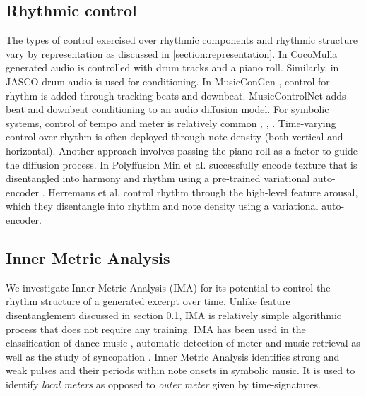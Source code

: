 \subsection{Rhythmic control} \label{section:rhytmic_weight}
The types of control exercised over rhythmic components and rhythmic structure vary by representation as discussed in \ref{section:representation}. In CocoMulla \cite{Lin_cocomulla_2024} generated audio is controlled with drum tracks and a piano roll. Similarly, in JASCO\cite{Tal_jasco} drum audio is used for conditioning. In MusicConGen \cite{Lan_Hsiao_Cheng_Yang_musicongen_2024}, control for rhythm is added through tracking beats and downbeat. MusicControlNet \cite{Wu_Donahue_musicontrolnet_2023} adds beat and downbeat conditioning to an audio diffusion model.
For symbolic systems, control of tempo and meter is relatively common \cite{Rütte_figaro_2023}, \cite{Huang_Yang_remi_pop_transformer_2020}, \cite{Lu_Xu_Kang_Yu_Xing_Tan_Bian_MuseCoco_2023}. Time-varying control over rhythm is often deployed through note density (both vertical and horizontal)\cite{Rütte_figaro_2023}\cite{Huang_rule_diffusion_2024}. Another approach \cite{Zhu_Liu_Jiang_Zheng_texture_2024} involves passing the piano roll as a factor to guide the diffusion process. In Polyffusion \cite{Min_Jiang_Xia_Zhao_polyffusion_2023} Min et al. successfully encode texture that is disentangled into harmony and rhythm using a pre-trained variational auto-encoder \cite{Wang_vae_chord_rhythm_2020}. Herremans et al. \cite{Tan_Herremans_2020} control rhythm through the high-level feature arousal, which they disentangle into rhythm and note density using a variational auto-encoder. 

\subsection{Inner Metric Analysis} \label{section:ima}
We investigate Inner Metric Analysis (IMA) for its potential to control the rhythm structure of a generated excerpt over time. Unlike feature disentanglement discussed in section \ref{section:rhytmic_weight}, IMA is relatively simple algorithmic process that does not require any training. IMA has been used in the classification of dance-music \cite{Chew_Volk_Lee_Dance_metric_weight_2005}, automatic detection of meter \cite{Haas_Volk_2016} and music retrieval \cite{Volk_Garbers_VanKranenburg_Wiering_Grijp_Veltkamp_2009} as well as the study of syncopation \cite{Bemman2024}\cite{Volk2008Syncopation}.
Inner Metric Analysis identifies strong and weak pulses and their periods within note onsets in symbolic music. It is used to identify \textit{local meters} as opposed to \textit{outer meter} given by time-signatures.

